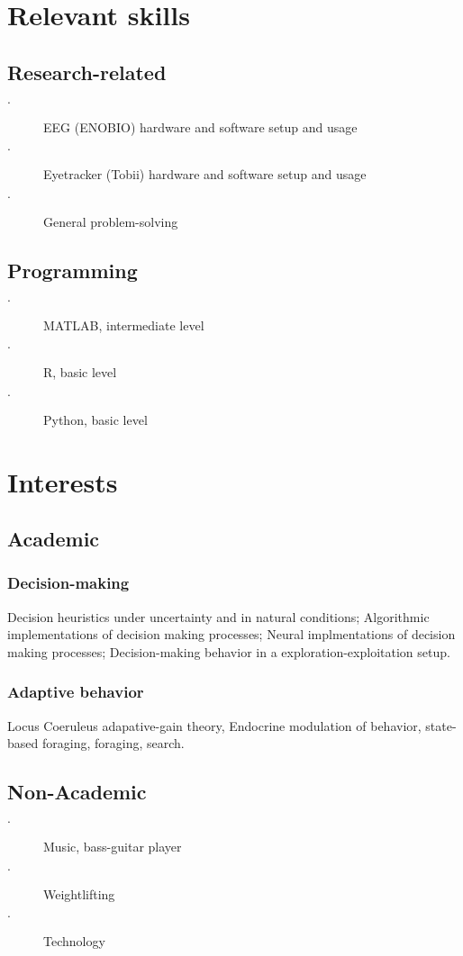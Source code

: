 \documentclass{article}
\begin{document}
\section{Relevant skills}
\subsection{Research-related}
\begin{description}
    \item[$\cdot$] EEG (ENOBIO) hardware and software setup and usage
    \item[$\cdot$] Eyetracker (Tobii) hardware and software setup and usage
    \item[$\cdot$] General problem-solving

\end{description}
\subsection{Programming}
\begin{description}
    \item[$\cdot$] MATLAB, intermediate level
    \item[$\cdot$] R, basic level
    \item[$\cdot$] Python, basic level
\end{description}
\section{Interests}
\subsection{Academic}
\subsubsection{Decision-making} Decision heuristics under uncertainty and in natural conditions; Algorithmic implementations of decision making processes; Neural implmentations of decision making processes; Decision-making behavior in a exploration-exploitation setup.
\subsubsection{Adaptive behavior} Locus Coeruleus adapative-gain theory, Endocrine modulation of behavior, state-based foraging, foraging, search.
\subsection{Non-Academic}
\begin{description}
    \item[$\cdot$] Music, bass-guitar player
    \item[$\cdot$] Weightlifting
    \item[$\cdot$] Technology
\end{description}
\end{document}
